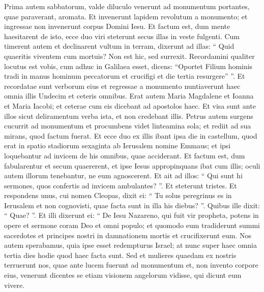 \begin{biblechapter}
\begin{biblechapter}
\begin{biblechapter}
\begin{biblechapter}
\begin{biblechapter}
\begin{biblechapter}
\begin{biblechapter}
\begin{biblechapter}
\begin{biblechapter}
\begin{biblechapter}
\begin{biblechapter}
\begin{biblechapter}
\begin{biblechapter}
\begin{biblechapter}
\begin{biblechapter}
\begin{biblechapter}
\begin{biblechapter}
\begin{biblechapter}
\begin{biblechapter}
\begin{biblechapter}
\begin{biblechapter}
\begin{biblechapter}
\begin{biblechapter}
\begin{biblechapter}
\verse Prima autem sabbatorum, valde diluculo venerunt ad monumentum portantes, quae paraverant, aromata. 
\verse Et invenerunt lapidem revolutum a monumento; 
 \verse et ingressae non invenerunt corpus Domini Iesu. 
\verse Et factum est, dum mente haesitarent de isto, ecce duo viri steterunt secus illas in veste fulgenti. 
 \verse Cum timerent autem et declinarent vultum in terram, dixerunt ad illas: “ Quid quaeritis viventem cum mortuis? 
\verse Non est hic, sed surrexit. Recordamini qualiter locutus est vobis, cum adhuc in Galilaea esset, 
\verse dicens: “Oportet Filium hominis tradi in manus hominum peccatorum et crucifigi et die tertia resurgere” ”. 
\verse Et recordatae sunt verborum eius 
\verse et regressae a monumento nuntiaverunt haec omnia illis Undecim et ceteris omnibus. 
\verse Erat autem Maria Magdalene et Ioanna et Maria Iacobi; et ceterae cum eis dicebant ad apostolos haec. 
\verse Et visa sunt ante illos sicut deliramentum verba ista, et non credebant illis. 
\verse Petrus autem surgens cucurrit ad monumentum et procumbens videt linteamina sola; et rediit ad sua mirans, quod factum fuerat.
 \verse Et ecce duo ex illis ibant ipsa die in castellum, quod erat in spatio stadiorum sexaginta ab Ierusalem nomine Emmaus; 
\verse et ipsi loquebantur ad invicem de his omnibus, quae acciderant. 
\verse Et factum est, dum fabularentur et secum quaererent, et ipse Iesus appropinquans ibat cum illis; 
\verse oculi autem illorum tenebantur, ne eum agnoscerent. 
\verse Et ait ad illos: “ Qui sunt hi sermones, quos confertis ad invicem ambulantes? ”. Et steterunt tristes. 
 \verse Et respondens unus, cui nomen Cleopas, dixit ei: “ Tu solus peregrinus es in Ierusalem et non cognovisti, quae facta sunt in illa his diebus? ”. 
\verse Quibus ille dixit: “ Quae? ”. Et illi dixerunt ei: “ De Iesu Nazareno, qui fuit vir propheta, potens in opere et sermone coram Deo et omni populo; 
\verse et quomodo eum tradiderunt summi sacerdotes et principes nostri in damnationem mortis et crucifixerunt eum. 
\verse Nos autem sperabamus, quia ipse esset redempturus Israel; at nunc super haec omnia tertia dies hodie quod haec facta sunt. 
\verse Sed et mulieres quaedam ex nostris terruerunt nos, quae ante lucem fuerunt ad monumentum 
\verse et, non invento corpore eius, venerunt dicentes se etiam visionem angelorum vidisse, qui dicunt eum vivere. 

\end{biblechapter}
\end{biblechapter}
\end{biblechapter}
\end{biblechapter}
\end{biblechapter}
\end{biblechapter}
\end{biblechapter}
\end{biblechapter}
\end{biblechapter}
\end{biblechapter}
\end{biblechapter}
\end{biblechapter}
\end{biblechapter}
\end{biblechapter}
\end{biblechapter}
\end{biblechapter}
\end{biblechapter}
\end{biblechapter}
\end{biblechapter}
\end{biblechapter}
\end{biblechapter}
\end{biblechapter}
\end{biblechapter}
\end{biblechapter}
